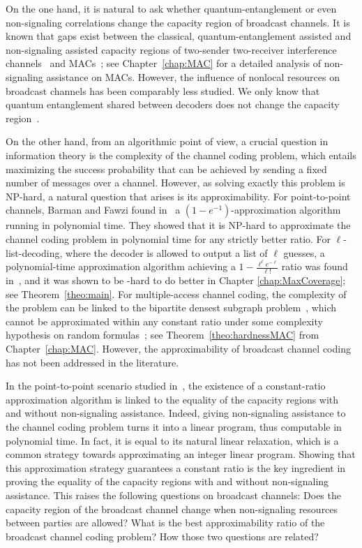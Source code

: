 On the one hand, it is natural to ask whether quantum-entanglement or even non-signaling correlations change the capacity region of broadcast channels. It is known that gaps exist between the classical, quantum-entanglement assisted and non-signaling assisted capacity regions of two-sender two-receiver interference channels~\cite{QS17} and MACs~\cite{LALS20,SLSS22}; see Chapter~\ref{chap:MAC} for a detailed analysis of non-signaling assistance on MACs. However, the influence of nonlocal resources on broadcast channels has been comparably less studied. We only know that quantum entanglement shared between decoders does not change the capacity region~\cite{PDB21}.

On the other hand, from an algorithmic point of view, a crucial question in information theory is the complexity of the channel coding problem, which entails maximizing the success probability that can be achieved by sending a fixed number of messages over a channel. However, as solving exactly this problem is \textrm{NP}-hard, a natural question that arises is its approximability. For point-to-point channels, Barman and Fawzi found in~\cite{BF18} a $(1-e^{-1})$-approximation algorithm running in polynomial time. They showed that it is \textrm{NP}-hard to approximate the channel coding problem in polynomial time for any strictly better ratio. For $\ell$-list-decoding, where the decoder is allowed to output a list of $\ell$ guesses, a polynomial-time approximation algorithm achieving a $1-\frac{\ell^{\ell}e^{-\ell}}{\ell!}$ ratio was found in~\cite{BFGG20}, and it was shown to be -hard to do better in Chapter \ref{chap:MaxCoverage}; see Theorem~\ref{theo:main}. For multiple-access channel coding, the complexity of the problem can be linked to the bipartite densest subgraph problem~\cite{FKP01}, which cannot be approximated within any constant ratio under some complexity hypothesis on random formulas~\cite{AAMMW11}; see Theorem~\ref{theo:hardnessMAC} from Chapter~\ref{chap:MAC}. However, the approximability of broadcast channel coding has not been addressed in the literature.

In the point-to-point scenario studied in~\cite{BF18}, the existence of a constant-ratio approximation algorithm is linked to the equality of the capacity regions with and without non-signaling assistance. Indeed, giving non-signaling assistance to the channel coding problem turns it into a linear program, thus computable in polynomial time. In fact, it is equal to its natural linear relaxation, which is a common strategy towards approximating an integer linear program. Showing that this approximation strategy guarantees a constant ratio is the key ingredient in proving the equality of the capacity regions with and without non-signaling assistance. %
This raises the following questions on broadcast channels: Does the capacity region of the broadcast channel change when non-signaling resources between parties are allowed? What is the best approximability ratio of the broadcast channel coding problem? How those two questions are related?


